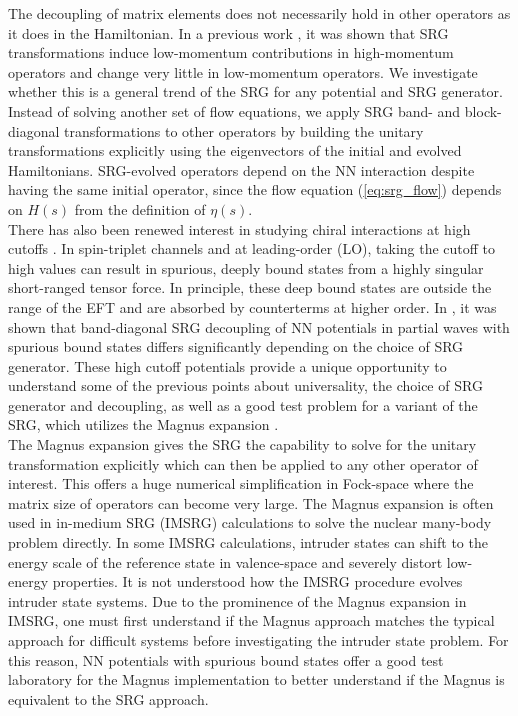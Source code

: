 \documentclass[preprintnumbers,floatfix,aps,prc,preprint,nofootinbib]{revtex4-1}
\begin{document}
The decoupling of matrix elements does not necessarily hold in other operators as it does in the Hamiltonian. In a previous work \cite{Anderson:2010aq}, it was shown that SRG transformations induce low-momentum contributions in high-momentum operators and change very little in low-momentum operators. We investigate whether this is a general trend of the SRG for any potential and SRG generator. Instead of solving another set of flow equations, we apply SRG band- and block-diagonal transformations to other operators by building the unitary transformations explicitly using the eigenvectors of the initial and evolved Hamiltonians. SRG-evolved operators depend on the NN interaction despite having the same initial operator, since the flow equation (\ref{eq:srg_flow}) depends on $H(s)$ from the definition of $\eta(s)$.
\\

There has also been renewed interest in studying chiral interactions at high cutoffs \cite{Tews:2018sbi}. In spin-triplet channels and at leading-order (LO), taking the cutoff to high values can result in spurious, deeply bound states from a highly singular short-ranged tensor force. In principle, these deep bound states are outside the range of the EFT and are absorbed by counterterms at higher order. In \cite{Wendt:2011qj}, it was shown that band-diagonal SRG decoupling of NN potentials in partial waves with spurious bound states differs significantly depending on the choice of SRG generator. These high cutoff potentials provide a unique opportunity to understand some of the previous points about universality, the choice of SRG generator and decoupling, as well as a good test problem for a variant of the SRG, which utilizes the Magnus expansion \cite{Morris:2015yna}.
\\

The Magnus expansion gives the SRG the capability to solve for the unitary transformation explicitly which can then be applied to any other operator of interest. This offers a huge numerical simplification in Fock-space where the matrix size of operators can become very large. The Magnus expansion is often used in in-medium SRG (IMSRG) calculations to solve the nuclear many-body problem directly. In some IMSRG calculations, intruder states can shift to the energy scale of the reference state in valence-space and severely distort low-energy properties. It is not understood how the IMSRG procedure evolves intruder state systems. Due to the prominence of the Magnus expansion in IMSRG, one must first understand if the Magnus approach matches the typical approach for difficult systems before investigating the intruder state problem. For this reason, NN potentials with spurious bound states offer a good test laboratory for the Magnus implementation to better understand if the Magnus is equivalent to the SRG approach.
\\
\end{document}
